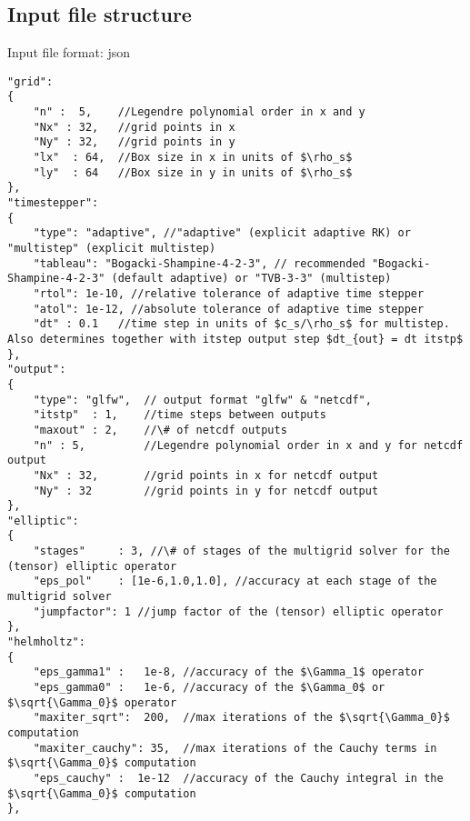 \subsection{Input file structure}
Input file format: json
\begin{verbatim}
"grid":
{
    "n" :  5,    //Legendre polynomial order in x and y 
    "Nx" : 32,   //grid points in x
    "Ny" : 32,   //grid points in y
    "lx"  : 64,  //Box size in x in units of $\rho_s$
    "ly"  : 64   //Box size in y in units of $\rho_s$
},
"timestepper":
{
    "type": "adaptive", //"adaptive" (explicit adaptive RK) or "multistep" (explicit multistep)
    "tableau": "Bogacki-Shampine-4-2-3", // recommended "Bogacki-Shampine-4-2-3" (default adaptive) or "TVB-3-3" (multistep)
    "rtol": 1e-10, //relative tolerance of adaptive time stepper
    "atol": 1e-12, //absolute tolerance of adaptive time stepper
    "dt" : 0.1   //time step in units of $c_s/\rho_s$ for multistep. Also determines together with itstep output step $dt_{out} = dt itstp$
},
"output":
{
    "type": "glfw",  // output format "glfw" & "netcdf",
    "itstp"  : 1,    //time steps between outputs
    "maxout" : 2,    //\# of netcdf outputs
    "n" : 5,         //Legendre polynomial order in x and y for netcdf output
    "Nx" : 32,       //grid points in x for netcdf output
    "Ny" : 32        //grid points in y for netcdf output
},    
"elliptic":
{
    "stages"     : 3, //\# of stages of the multigrid solver for the (tensor) elliptic operator
    "eps_pol"    : [1e-6,1.0,1.0], //accuracy at each stage of the multigrid solver
    "jumpfactor": 1 //jump factor of the (tensor) elliptic operator
},
"helmholtz":
{
    "eps_gamma1" :   1e-8, //accuracy of the $\Gamma_1$ operator
    "eps_gamma0" :   1e-6, //accuracy of the $\Gamma_0$ or $\sqrt{\Gamma_0}$ operator
    "maxiter_sqrt":  200,  //max iterations of the $\sqrt{\Gamma_0}$ computation
    "maxiter_cauchy": 35,  //max iterations of the Cauchy terms in $\sqrt{\Gamma_0}$ computation
    "eps_cauchy" :  1e-12  //accuracy of the Cauchy integral in the $\sqrt{\Gamma_0}$ computation
},


\end{verbatim}
